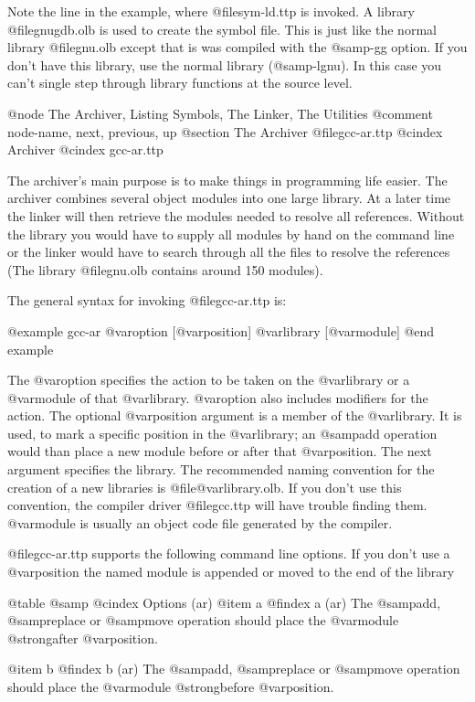 {{{{{Note the line in the example, where @file{sym-ld.ttp} is invoked. A
library @file{gnugdb.olb} is used to create the symbol file. This is
just like the normal library @file{gnu.olb} except that is was
compiled with the @samp{-gg} option. If you don't have this library,
use the normal library (@samp{-lgnu}). In this case you can't single
step through library functions at the source level.

@node     The Archiver, Listing Symbols, The Linker, The Utilities
@comment  node-name,    next,            previous,    up
@section The Archiver @file{gcc-ar.ttp}
@cindex Archiver
@cindex gcc-ar.ttp

The archiver's main purpose is to make things in programming life
easier. The archiver combines several object modules into one large
library. At a later time the linker will then retrieve the modules
needed to resolve all references. Without the library you would have to
supply all modules by hand on the command line or the linker would have
to search through all the files to resolve the references (The library
@file{gnu.olb} contains around 150 modules).

The general syntax for invoking @file{gcc-ar.ttp} is:

@example
gcc-ar @var{option} [@var{position}] @var{library} [@var{module}]
@end example

The @var{option} specifies the action to be taken on the @var{library}
or a @var{module} of that @var{library}. @var{option} also includes
modifiers for the action. The optional @var{position} argument is a
member of the @var{library}. It is used, to mark a specific position in
the @var{library}; an @samp{add} operation would than place a new module
before or after that @var{position}. The next argument specifies the
library. The recommended naming convention for the creation of a new
libraries is @file{@var{library}.olb}. If you don't use this convention,
the compiler driver @file{gcc.ttp} will have trouble finding them.
@var{module} is usually an object code file generated by the compiler.

@file{gcc-ar.ttp} supports the following command line options. If you
don't use a @var{position} the named module is appended or moved to the
end of the library

@table @samp
@cindex Options (ar)
@item a
@findex a (ar)
The @samp{add}, @samp{replace} or @samp{move} operation should place the
@var{module} @strong{after} @var{position}.

@item b
@findex b (ar)
The @samp{add}, @samp{replace} or @samp{move} operation should place the
@var{module} @strong{before} @var{position}.

}}}}}

